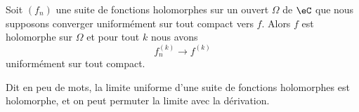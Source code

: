 \begin{theorem}       \label{ThoArYtQO}
	Soit \( (f_n)\) une suite de fonctions holomorphes sur un ouvert \( \Omega\) de \( \eC\) que nous supposons converger uniformément sur tout compact vers \( f\). Alors \( f\) est holomorphe sur \( \Omega\) et pour tout \( k\) nous avons
	\begin{equation}
		f^{(k)}_n\to f^{(k)}
	\end{equation}
	uniformément sur tout compact.

	Dit en peu de mots, la limite uniforme d'une suite de fonctions holomorphes est holomorphe, et on peut permuter la limite avec la dérivation.
\end{theorem}

